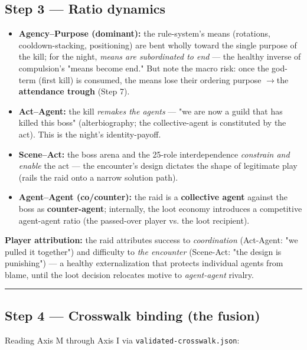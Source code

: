 \documentclass[11pt]{report}
\begin{document}
\subsection{Step 3 — Ratio dynamics}


\begin{itemize}
\item \textbf{Agency–Purpose (dominant):} the rule-system's means (rotations, cooldown-stacking, positioning) are bent wholly toward the single purpose of the kill; for the night, \textit{means are subordinated to end} — the healthy inverse of compulsion's "means become end." But note the macro risk: once the god-term (first kill) is consumed, the means lose their ordering purpose $\rightarrow$\allowbreak  the \textbf{attendance trough} (Step 7).
\item \textbf{Act–Agent:} the kill \textit{remakes the agents} — "we are now a guild that has killed this boss" (alterbiography; the collective-agent is constituted by the act). This is the night's identity-payoff.
\item \textbf{Scene–Act:} the boss arena and the 25-role interdependence \textit{constrain and enable} the act — the encounter's design dictates the shape of legitimate play (rails the raid onto a narrow solution path).
\item \textbf{Agent–Agent (co/counter):} the raid is a \textbf{collective agent} against the boss as \textbf{counter-agent}; internally, the loot economy introduces a competitive agent-agent ratio (the passed-over player vs. the loot recipient).
\end{itemize}


\textbf{Player attribution:} the raid attributes success to \textit{coordination} (Act-Agent: "we pulled it together") and difficulty to \textit{the encounter} (Scene-Act: "the design is punishing") — a healthy externalization that protects individual agents from blame, until the loot decision relocates motive to \textit{agent-agent} rivalry.


\vspace{0.4em}\hrule\vspace{0.8em}


\subsection{Step 4 — Crosswalk binding (the fusion)}


Reading Axis M through Axis I via \texttt{validated-\discretionary{}{}{}crosswalk.\discretionary{}{}{}json}:
\end{document}

